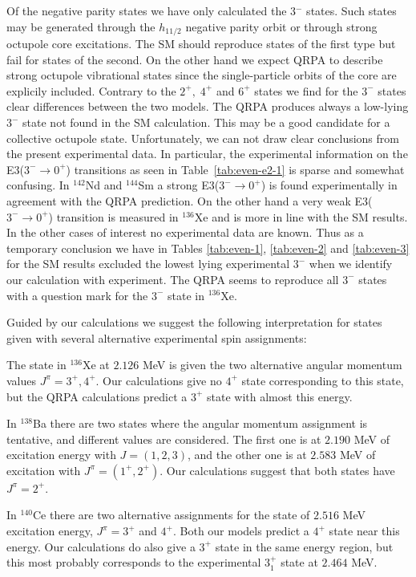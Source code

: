 Of the negative parity states we have only calculated the 3$^{-}$ states. 
Such states may be generated through the $h_{11/2}$ negative parity orbit or 
through strong octupole core excitations.
The SM should reproduce states of the first type but fail for states of the second.
On the other hand we expect QRPA to describe strong octupole vibrational states since  
the single-particle orbits of the core are explicily included.  
Contrary to the $2^{+},\;4^{+}$ and $6^{+}$ states we find for the $3^{-}$ states clear 
differences between the two models. The QRPA produces always
a low-lying $3^{-}$ state not found in the SM
calculation. This may be a good candidate for 
a collective octupole state.
Unfortunately, we can not draw clear conclusions from the present
experimental data. In particular, the experimental information
on the E3($3^{-} \rightarrow 0^{+}$) transitions
as seen in Table~\ref{tab:even-e2-1}
is sparse and somewhat confusing.
In $^{142}$Nd and $^{144}$Sm a strong   E3($3^{-} \rightarrow 0^{+}$) is found 
experimentally in agreement with the QRPA prediction. On the other hand a 
very weak  E3($3^{-} \rightarrow 0^{+}$) transition  is measured in $^{136}$Xe and  
is more in line with the SM results. 
In the other cases of interest no experimental data are 
known. Thus as a temporary conclusion we have in  
Tables \ref{tab:even-1}, \ref{tab:even-2} and \ref{tab:even-3} for the SM 
results excluded
the lowest lying experimental $3^{-}$ 
when we identify our calculation with experiment.
The QRPA seems to reproduce all $3^{-}$ states with a question mark for the 
$3^{-}$ state in $^{136}$Xe.

Guided by our calculations we suggest the following interpretation for 
states given with several alternative experimental spin assignments:

The state in $^{136}$Xe at $2.126$ MeV is given the two alternative angular 
momentum values $J^{\pi} = 3^{+},4^{+}$. Our calculations 
give no $4^{+}$ state corresponding to this state, but the QRPA 
calculations predict a $3^{+}$ state with almost this energy.

In $^{138}$Ba there are two states where the angular momentum assignment is
tentative, and different values are considered. The first one is at $2.190$ 
MeV of excitation energy with $J=(1,2,3)$, and the other one is at $2.583$ MeV 
of excitation with $J^{\pi} = (1^{+},2^{+})$. Our calculations suggest that 
both states have $J^{\pi} = 2^{+}$.

In $^{140}$Ce there are two alternative assignments for the state of $2.516$
MeV excitation energy, $J^{\pi} = 3^{+}$ and $4^{+}$. Both our models 
predict a $4^{+}$ state near this energy. Our calculations do also give a 
$3^{+}$ state in the same energy region, but this most probably corresponds 
to the experimental $3^{+}_{1}$ state at $2.464$ MeV.


